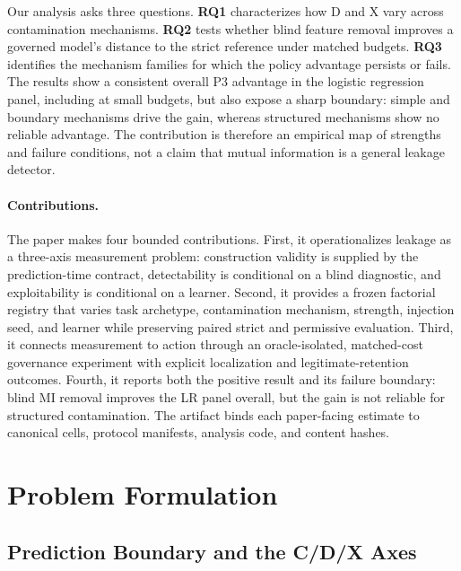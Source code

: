 \documentclass[sigconf,review]{acmart}
\begin{document}
Our analysis asks three questions. \textbf{RQ1} characterizes how D and X vary
across contamination mechanisms. \textbf{RQ2} tests whether blind feature
removal improves a governed model's distance to the strict reference under
matched budgets. \textbf{RQ3} identifies the mechanism families for which the
policy advantage persists or fails. The results show a consistent overall P3
advantage in the logistic regression panel, including at small budgets, but
also expose a sharp boundary: simple and boundary mechanisms drive the gain,
whereas structured mechanisms show no reliable advantage. The contribution is
therefore an empirical map of strengths and failure conditions, not a claim
that mutual information is a general leakage detector.

\paragraph{Contributions.}
The paper makes four bounded contributions. First, it operationalizes leakage
as a three-axis measurement problem: construction validity is supplied by the
prediction-time contract, detectability is conditional on a blind diagnostic,
and exploitability is conditional on a learner. Second, it provides a frozen
factorial registry that varies task archetype, contamination mechanism,
strength, injection seed, and learner while preserving paired strict and
permissive evaluation. Third, it connects measurement to action through an
oracle-isolated, matched-cost governance experiment with explicit localization
and legitimate-retention outcomes. Fourth, it reports both the positive result
and its failure boundary: blind MI removal improves the LR panel overall, but
the gain is not reliable for structured contamination. The artifact binds each
paper-facing estimate to canonical cells, protocol manifests, analysis code,
and content hashes.

\section{Problem Formulation}

\subsection{Prediction Boundary and the C/D/X Axes}
\end{document}

